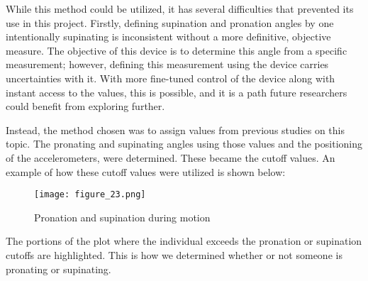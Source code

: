 While this method could be utilized, it has several difficulties that prevented its use in this project.
Firstly, defining supination and pronation angles by one intentionally supinating is inconsistent without a more definitive, objective measure.
The objective of this device is to determine this angle from a specific measurement; however, defining this measurement using the device carries uncertainties with it.
With more fine-tuned control of the device along with instant access to the values, this is possible, and it is a path future researchers could benefit from exploring further.\par
Instead, the method chosen was to assign values from previous studies on this topic.
The pronating and supinating angles using those values and the positioning of the accelerometers, were determined.
These became the cutoff values.
An example of how these cutoff values were utilized is shown below:\par
\begin{figure}
  \centering
  \texttt{[image: figure\_23.png]}
  \caption[Pronation and supination data]{Pronation and supination during motion}
  \label{fig:x pron. motion}
\end{figure}
The portions of the plot where the individual exceeds the pronation or supination cutoffs are highlighted.
This is how we determined whether or not someone is pronating or supinating.

